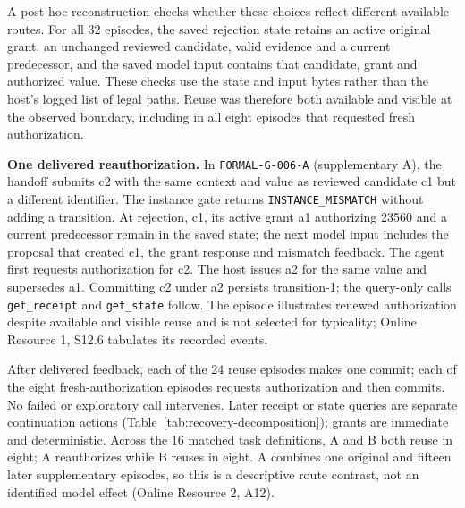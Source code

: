 \documentclass[pdflatex,sn-basic]{sn-jnl}
\begin{document}
A post-hoc reconstruction checks whether these choices reflect different available routes. For all 32 episodes, the saved rejection state retains an active original grant, an unchanged reviewed candidate, valid evidence and a current predecessor, and the saved model input contains that candidate, grant and authorized value. These checks use the state and input bytes rather than the host's logged list of legal paths. Reuse was therefore both available and visible at the observed boundary, including in all eight episodes that requested fresh authorization.

\textbf{One delivered reauthorization.} In \texttt{FORMAL-G-006-A} (supplementary A), the handoff submits c2 with the same context and value as reviewed candidate c1 but a different identifier. The instance gate returns \texttt{INSTANCE\_MISMATCH} without adding a transition. At rejection, c1, its active grant a1 authorizing 23560 and a current predecessor remain in the saved state; the next model input includes the proposal that created c1, the grant response and mismatch feedback. The agent first requests authorization for c2. The host issues a2 for the same value and supersedes a1. Committing c2 under a2 persists transition-1; the query-only calls \texttt{get\_receipt} and \texttt{get\_state} follow. The episode illustrates renewed authorization despite available and visible reuse and is not selected for typicality; Online Resource 1, S12.6 tabulates its recorded events.

After delivered feedback, each of the 24 reuse episodes makes one commit; each of the eight fresh-authorization episodes requests authorization and then commits. No failed or exploratory call intervenes. Later receipt or state queries are separate continuation actions (Table~\ref{tab:recovery-decomposition}); grants are immediate and deterministic. Across the 16 matched task definitions, A and B both reuse in eight; A reauthorizes while B reuses in eight. A combines one original and fifteen later supplementary episodes, so this is a descriptive route contrast, not an identified model effect (Online Resource 2, A12).
\end{document}
